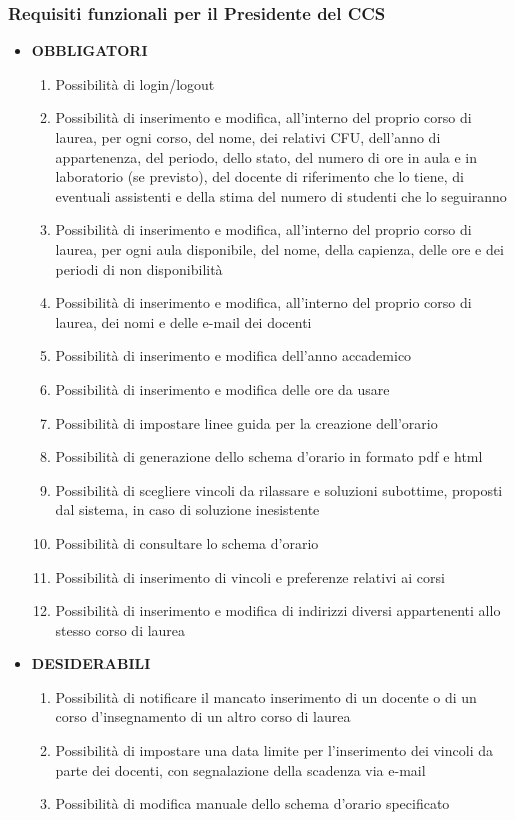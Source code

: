 \documentclass[11pt,a4paper]{article}
\begin{document}
\subsubsection{Requisiti funzionali per il Presidente del CCS}
\begin{itemize}
\item \textbf{OBBLIGATORI}
\begin{enumerate}
\item Possibilità di login/logout
\item Possibilità di inserimento e modifica, all'interno del proprio corso di laurea, per ogni corso, del nome, dei relativi CFU, dell'anno di appartenenza, del periodo, dello stato, del numero di ore in aula e in laboratorio (se previsto), del docente di riferimento che lo tiene, di eventuali assistenti e della stima del numero di studenti che lo seguiranno
\item Possibilità di inserimento e modifica, all'interno del proprio corso di laurea, per ogni aula disponibile, del nome, della capienza, delle ore e dei periodi di non disponibilità
\item Possibilità di inserimento e modifica, all'interno del proprio corso di laurea, dei nomi e delle e-mail dei docenti
\item Possibilità di inserimento e modifica dell'anno accademico
\item Possibilità di inserimento e modifica delle ore da usare
\item Possibilità di impostare linee guida per la creazione dell'orario
\item Possibilità di generazione dello schema d'orario in formato pdf e html
\item Possibilità di scegliere vincoli da rilassare e soluzioni subottime, proposti dal sistema, in caso di soluzione inesistente
\item Possibilità di consultare lo schema d'orario
\item Possibilità di inserimento di vincoli e preferenze relativi ai corsi
\item Possibilità di inserimento e modifica di indirizzi diversi appartenenti allo stesso corso di laurea
\end{enumerate}
\item \textbf{DESIDERABILI}
\begin{enumerate}
\item Possibilità di notificare il mancato inserimento di un docente o di un corso d'insegnamento di un altro corso di laurea
\item Possibilità di impostare una data limite per l'inserimento dei vincoli da parte dei docenti, con segnalazione della scadenza via e-mail
\item Possibilità di modifica manuale dello schema d'orario specificato
\end{enumerate}
\end{itemize}
\end{document}
